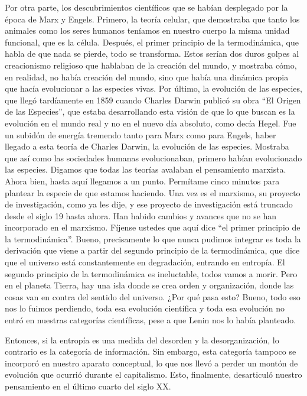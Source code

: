 \documentclass[
  a4paper,
]{article}
\begin{document}
Por otra parte, los descubrimientos científicos que se habían desplegado
por la época de Marx y Engels. Primero, la teoría celular, que
demostraba que tanto los animales como los seres humanos teníamos en
nuestro cuerpo la misma unidad funcional, que es la célula. Después, el
primer principio de la termodinámica, que habla de que nada se pierde,
todo se transforma. Estos serían dos duros golpes al creacionismo
religioso que hablaban de la creación del mundo, y mostraba cómo, en
realidad, no había creación del mundo, sino que había una dinámica
propia que hacía evolucionar a las especies vivas. Por último, la
evolución de las especies, que llegó tardíamente en 1859 cuando Charles
Darwin publicó su obra ``El Origen de las Especies'', que estaba
desarrollando esta visión de que lo que buscan es la evolución en el
mundo real y no en el nuevo día absoluto, como decía Hegel. Fue un
subidón de energía tremendo tanto para Marx como para Engels, haber
llegado a esta teoría de Charles Darwin, la evolución de las especies.
Mostraba que así como las sociedades humanas evolucionaban, primero
habían evolucionado las especies. Digamos que todas las teorías avalaban
el pensamiento marxista. Ahora bien, hasta aquí llegamos a un punto.
Permítame cinco minutos para plantear la especie de que estamos
haciendo. Una vez es el marxismo, su proyecto de investigación, como ya
les dije, y ese proyecto de investigación está truncado desde el siglo
19 hasta ahora. Han habido cambios y avances que no se han incorporado
en el marxismo. Fíjense ustedes que aquí dice ``el primer principio de
la termodinámica''. Bueno, precisamente lo que nunca pudimos integrar es
toda la derivación que viene a partir del segundo principio de la
termodinámica, que dice que el universo está constantemente en
degradación, entrando en entropía. El segundo principio de la
termodinámica es ineluctable, todos vamos a morir. Pero en el planeta
Tierra, hay una isla donde se crea orden y organización, donde las cosas
van en contra del sentido del universo. ¿Por qué pasa esto? Bueno, todo
eso nos lo fuimos perdiendo, toda esa evolución científica y toda esa
evolución no entró en nuestras categorías científicas, pese a que Lenin
nos lo había planteado.

Entonces, si la entropía es una medida del desorden y la
desorganización, lo contrario es la categoría de información. Sin
embargo, esta categoría tampoco se incorporó en nuestro aparato
conceptual, lo que nos llevó a perder un montón de evolución que ocurrió
durante el capitalismo. Esto, finalmente, desarticuló nuestro
pensamiento en el último cuarto del siglo XX.
\end{document}
